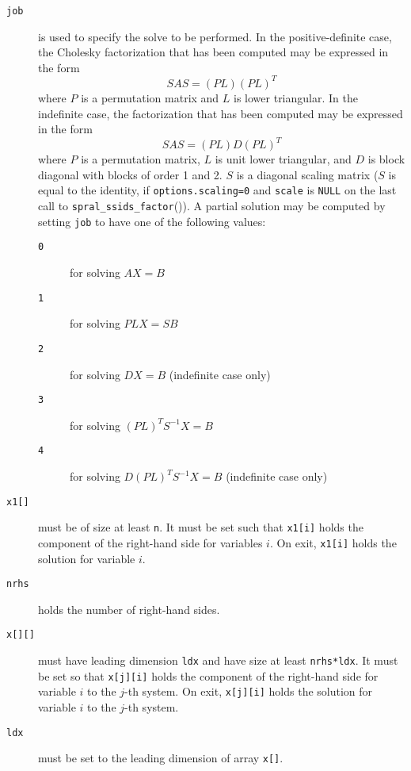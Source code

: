 \begin{description}
\item[\texttt{job}] is used to specify the solve to be performed.
   In the positive-definite case, the Cholesky factorization that has been
   computed may be expressed in the form
   \[ {SAS} = ({PL})({PL})^T \]
   where $P$ is a permutation matrix and $L$ is lower triangular.
   In the indefinite case, the factorization that has been computed may be
   expressed in the form
   \[ {S AS} = ({PL}){D}({PL})^T \]
   where $P$ is a permutation matrix, $L$ is unit lower triangular, and $D$ is
   block diagonal with blocks of order 1 and 2. $S$ is a diagonal scaling
   matrix ($S$ is equal to the identity, if \texttt{options.scaling=0} and
   {\tt scale} is \texttt{NULL} on the last call to {\tt spral\_ssids\_factor}()).
   A partial solution may be computed by setting {\tt job} to have one of the
   following values:
   \begin{description}
   \item[\texttt{0}] for solving $AX = B$
   \item[\texttt{1}] for solving ${PLX} = {SB}$
   \item[\texttt{2}] for solving ${DX} = {B}$ (indefinite case only)
   \item[\texttt{3}] for solving $({PL})^T{S^{-1}X} = {B}$
   \item[\texttt{4}] for solving $D({PL})^T{S^{-1}X} = {B}$ (indefinite case only)
   \end{description}

\item[\texttt{x1[]}] must be of size at least \texttt{n}. It must be set
   such that \texttt{x1[i]} holds the component of the right-hand side for
   variables $i$. On exit, \texttt{x1[i]} holds the solution for variable
   $i$.

\item[\texttt{nrhs}] holds the number of right-hand sides.

\item[\texttt{x[][]}] must have leading dimension \texttt{ldx} and have size at
   least \texttt{nrhs*ldx}. It must be set so that \texttt{x[j][i]} holds the
   component of the right-hand side for variable $i$ to the $j$-th
   system. On exit, \texttt{x[j][i]} holds the solution for variable $i$ to
   the $j$-th system.

\item[\texttt{ldx}] must be set to the leading dimension of array \texttt{x[]}.


\end{description}
